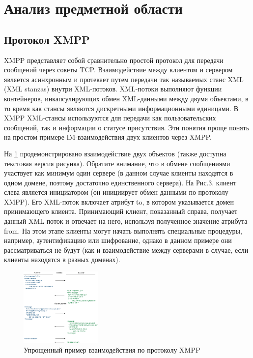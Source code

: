 \documentclass{khaireport}
\begin{document}
\section{Анализ предметной области}
\subsection{Протокол XMPP}
XMPP представляет собой сравнительно простой протокол для передачи сообщений через сокеты TCP. Взаимодействие между клиентом и сервером является асинхронным и протекает путем передачи так называемых станс XML (XML stanzas) внутри XML-потоков. XML-потоки выполняют функции контейнеров, инкапсулирующих обмен XML-данными между двумя объектами, в то время как стансы являются дискретными информационными единицами. В XMPP XML-стансы используются для передачи как пользовательских сообщений, так и информации о статусе присутствия. Эти понятия проще понять на простом примере IM-взаимодействия двух клиентов через XMPP.

На \ref{fig:baseXmpp} продемонстрировано взаимодействие двух объектов (также доступна текстовая версия рисунка). Обратите внимание, что в обмене сообщениями участвует как минимум один сервере (в данном случае клиенты находятся в одном домене, поэтому достаточно единственного сервера). На Рис.3. клиент слева является инициатором (он инициирует обмен данными по протоколу XMPP). Его XML-поток включает атрибут to, в котором указывается домен принимающего клиента. Принимающий клиент, показанный справа, получает данный XML-поток и отвечает на него, используя полученное значение атрибута from. На этом этапе клиенты могут начать выполнять специальные процедуры, например, аутентификацию или шифрование, однако в данном примере они рассматриваться не будут (как и взаимодействие между серверами в случае, если клиенты находятся в разных доменах).

\begin{figure}[]
\centering
\includegraphics[width = 4cm]{images/1234.png} 
\caption{Упрощенный пример взаимодействия по протоколу XMPP}
\label{fig:baseXmpp}
\end{figure}
\end{document}
